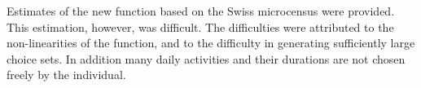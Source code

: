 Estimates of the new function based on the Swiss microcensus were provided. 
This estimation, however, was difficult.  The difficulties were attributed to the non-linearities of the function, and to the difficulty in generating sufficiently large choice sets. 
In addition many daily activities and their durations are not chosen freely by the individual. 





